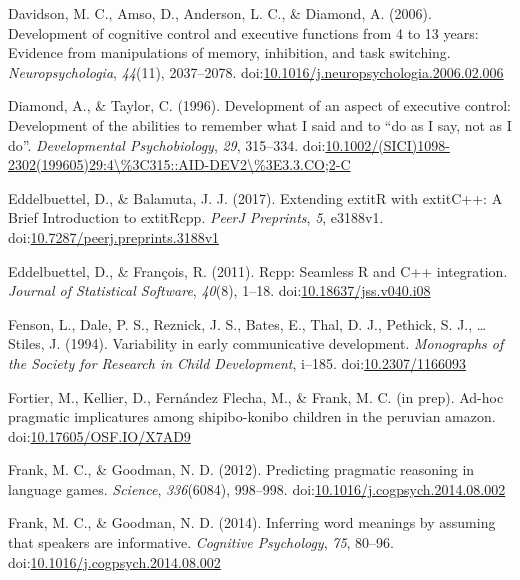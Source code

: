 \documentclass[man]{apa6}
\begin{document}
\hypertarget{ref-davidson2006}{}
Davidson, M. C., Amso, D., Anderson, L. C., \& Diamond, A. (2006).
Development of cognitive control and executive functions from 4 to 13
years: Evidence from manipulations of memory, inhibition, and task
switching. \emph{Neuropsychologia}, \emph{44}(11), 2037--2078.
doi:\href{https://doi.org/10.1016/j.neuropsychologia.2006.02.006}{10.1016/j.neuropsychologia.2006.02.006}

\hypertarget{ref-diamond1996}{}
Diamond, A., \& Taylor, C. (1996). Development of an aspect of executive
control: Development of the abilities to remember what I said and to
``do as I say, not as I do''. \emph{Developmental Psychobiology},
\emph{29}, 315--334.
doi:\href{https://doi.org/10.1002/(SICI)1098-2302(199605)29:4/\%3C315::AID-DEV2/\%3E3.3.CO;2-C}{10.1002/(SICI)1098-2302(199605)29:4\textbackslash{}\%3C315::AID-DEV2\textbackslash{}\%3E3.3.CO;2-C}

\hypertarget{ref-R-Rcpp_b}{}
Eddelbuettel, D., \& Balamuta, J. J. (2017). Extending extitR with
extitC++: A Brief Introduction to extitRcpp. \emph{PeerJ Preprints},
\emph{5}, e3188v1.
doi:\href{https://doi.org/10.7287/peerj.preprints.3188v1}{10.7287/peerj.preprints.3188v1}

\hypertarget{ref-R-Rcpp_a}{}
Eddelbuettel, D., \& François, R. (2011). Rcpp: Seamless R and C++
integration. \emph{Journal of Statistical Software}, \emph{40}(8),
1--18.
doi:\href{https://doi.org/10.18637/jss.v040.i08}{10.18637/jss.v040.i08}

\hypertarget{ref-fenson1994}{}
Fenson, L., Dale, P. S., Reznick, J. S., Bates, E., Thal, D. J.,
Pethick, S. J., \ldots{} Stiles, J. (1994). Variability in early
communicative development. \emph{Monographs of the Society for Research
in Child Development}, i--185.
doi:\href{https://doi.org/10.2307/1166093}{10.2307/1166093}

\hypertarget{ref-fortierunderrev}{}
Fortier, M., Kellier, D., Fernández Flecha, M., \& Frank, M. C. (in
prep). Ad-hoc pragmatic implicatures among shipibo-konibo children in
the peruvian amazon.
doi:\href{https://doi.org/10.17605/OSF.IO/X7AD9}{10.17605/OSF.IO/X7AD9}

\hypertarget{ref-frank2012}{}
Frank, M. C., \& Goodman, N. D. (2012). Predicting pragmatic reasoning
in language games. \emph{Science}, \emph{336}(6084), 998--998.
doi:\href{https://doi.org/10.1016/j.cogpsych.2014.08.002}{10.1016/j.cogpsych.2014.08.002}

\hypertarget{ref-frank2014}{}
Frank, M. C., \& Goodman, N. D. (2014). Inferring word meanings by
assuming that speakers are informative. \emph{Cognitive Psychology},
\emph{75}, 80--96.
doi:\href{https://doi.org/10.1016/j.cogpsych.2014.08.002}{10.1016/j.cogpsych.2014.08.002}
\end{document}
